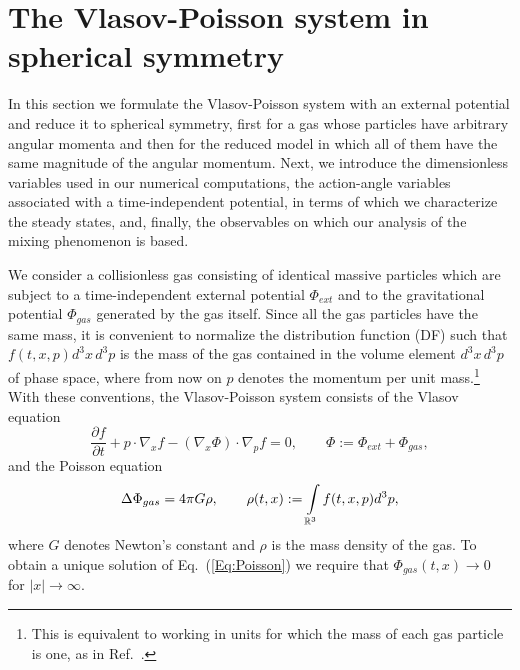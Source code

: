 \section{The Vlasov-Poisson system in spherical symmetry}
\label{Sec:VPSphSym}

In this section we formulate the Vlasov-Poisson system with an external potential and reduce it to spherical symmetry, first for a gas whose particles have arbitrary angular momenta and then for the reduced model in which all of them have the same magnitude of the angular momentum. Next, we introduce the dimensionless variables used in our numerical computations, the action-angle variables associated with a time-independent potential, in terms of which we characterize the steady states, and, finally, the observables on which our analysis of the mixing phenomenon is based.

We consider a collisionless gas consisting of identical massive particles which are subject to a time-independent external potential $\Phi_{ext}$ and to the gravitational potential $\Phi_{gas}$ generated by the gas itself. Since all the gas particles have the same mass, it is convenient to normalize the distribution function (DF) such that $f(t,x,p) d^3 x\, d^3 p$ is the mass of the gas contained in the volume element $d^3 x\, d^3 p$ of phase space, where from now on $p$ denotes the momentum per unit mass.\footnote{This is equivalent to working in units for which the mass of each gas particle is one, as in Ref.~\cite{pRoS20}.} With these conventions, the Vlasov-Poisson system consists of the Vlasov equation
\begin{equation}
\frac{\partial f}{\partial t} + p\cdot\nabla_x f - (\nabla_x\Phi)\cdot\nabla_p f = 0,\qquad
\Phi := \Phi_{ext} + \Phi_{gas},
\label{Eq:Vlasov}
\end{equation}
and the Poisson equation
\begin{equation}
\Delta\Phi_{gas} = 4\pi G\rho,\qquad
\rho(t,x) := \int\limits_{\mathbb{R}^3} f(t,x,p) d^3 p,
\label{Eq:Poisson}
\end{equation}
where $G$ denotes Newton's constant and $\rho$ is the mass density of the gas. To obtain a unique solution of Eq.~(\ref{Eq:Poisson}) we require that $\Phi_{gas}(t,x)\to 0$ for $|x|\to \infty$.

